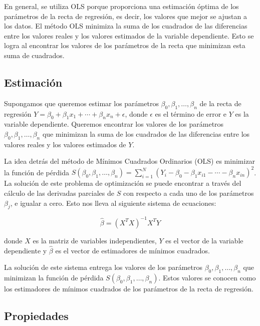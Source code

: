 \documentclass[
]{book}
\begin{document}
En general, se utiliza OLS porque proporciona una estimación óptima de
los parámetros de la recta de regresión, es decir, los valores que mejor
se ajustan a los datos. El método OLS minimiza la suma de los cuadrados
de las diferencias entre los valores reales y los valores estimados de
la variable dependiente. Esto se logra al encontrar los valores de los
parámetros de la recta que minimizan esta suma de cuadrados.

\hypertarget{estimaciuxf3n}{%
\subsection{Estimación}\label{estimaciuxf3n}}

Supongamos que queremos estimar los parámetros
\(\beta_0, \beta_1, \ldots, \beta_n\) de la recta de regresión
\(Y = \beta_0 + \beta_1 x_1 + \cdots + \beta_n x_n + \epsilon\), donde
\(\epsilon\) es el término de error e \(Y\) es la variable dependiente.
Queremos encontrar los valores de los parámetros
\(\beta_0, \beta_1, \ldots, \beta_n\) que minimizan la suma de los
cuadrados de las diferencias entre los valores reales y los valores
estimados de \(Y\).

La idea detrás del método de Mínimos Cuadrados Ordinarios (OLS) es
minimizar la función de pérdida
\(S(\beta_0, \beta_1, \ldots, \beta_n) = \sum_{i=1}^N (Y_i - \beta_0 - \beta_1 x_{i1} - \cdots - \beta_n x_{in})^2\).
La solución de este problema de optimización se puede encontrar a través
del cálculo de las derivadas parciales de \(S\) con respecto a cada uno de
los parámetros \(\beta_j\), e igualar a cero. Esto nos lleva al siguiente
sistema de ecuaciones:

\[\hat{\beta}=(X^TX)^{-1}X^TY\]

donde \(X\) es la matriz de variables independientes, \(Y\) es el vector de
la variable dependiente y \(\hat{\beta}\) es el vector de estimadores de
mínimos cuadrados.

La solución de este sistema entrega los valores de los parámetros
\(\beta_0, \beta_1, \ldots, \beta_n\) que minimizan la función de pérdida
\(S(\beta_0, \beta_1, \ldots, \beta_n)\). Estos valores se conocen como
los estimadores de mínimos cuadrados de los parámetros de la recta de
regresión.

\hypertarget{propiedades}{%
\subsection{Propiedades}\label{propiedades}}
\end{document}
